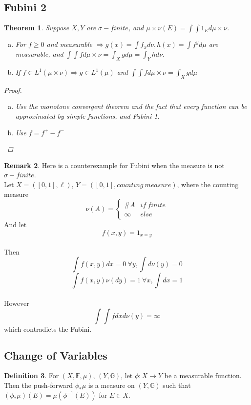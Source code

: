 \documentclass{article}
\newtheorem{theorem}{Theorem}[section]
\theoremstyle{definition}
\newtheorem{definition}[theorem]{Definition}
\newtheorem{remark}[theorem]{Remark}
\begin{document}
\subsection{Fubini 2}
\begin{theorem}
	Suppose $X,Y$ are $\sigma-finite$, and $\mu \times \nu (E) = \int \int 1_{E} d\mu\times\nu$.
	\begin{enumerate}[a)]
		\item For $f\geq 0$ and measurable $\Rightarrow g(x)=\int f_x d\nu, h(x)=\int f^y d\mu$ are measurable, and $\int\int f d\mu \times \nu = \int_{X} g d\mu = \int_{Y} h d\nu.$
		\item If $f\in L^{1}(\mu \times \nu) \Rightarrow g\in L^{1}(\mu)$ and $\int\int f d\mu \times \nu = \int_{X} g d\mu$
	\end{enumerate}

\begin{proof}
	\begin{enumerate}[a)]
		\item Use the monotone convergent theorem and the fact that every function can be approximated by simple functions, and Fubini 1. 
		\item Use $f=f^{+}-f^{-}$		
	\end{enumerate}
\end{proof}
\end{theorem}
\begin{remark}
	Here is a counterexample for Fubini when the measure is not $\sigma-finite$.\\	
	Let $X=([0,1],\ell)$, $Y=([0,1],counting \ measure)$, where the counting measure $$\nu(A) = \left\{  
	\begin{array}{cc}
	\#A & if \ finite \\
	\infty & else
	\end{array}\right.$$  
	And let $$f(x,y)=1_{x=y}$$ \\
	Then $$\int f(x,y) dx=0 \ \forall y, \int d\nu(y)=0$$
	$$\int f(x,y) \nu(dy) = 1 \ \forall x, \int dx=1$$\\ 
	However $$\int\int f dxd\nu(y)=\infty$$ which contradicts the Fubini.
\end{remark}

\subsection{Change of Variables}

\begin{definition}
	For $(X,\mathbb{F},\mu)$, $(Y,\mathbb{G})$, let $\phi : X\rightarrow Y$ be a measurable function. Then the push-forward $\phi_{*}\mu$ is a measure on $(Y,\mathbb{G})$ such that $(\phi_{*}\mu)(E)=\mu(\phi^{-1}(E))$ for $E\in X$.
\end{definition}
\end{document}
